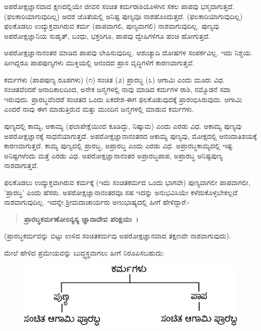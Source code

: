 
ಅಪರೋಕ್ಷಜ್ಞಾನವಾದ ಕ್ಷಣದಲ್ಲಿಯೇ ಜೀವನ ಸಂಚಿತ ಕರ್ಮರಾಶಿಯೊಳಗಿನ ಸಕಲ ಪಾಪವು ಭಸ್ಮವಾಗುತ್ತದೆ. (ಫಲಕಾರಿಯಾಗುವುದಿಲ್ಲ) ಅದರ ಜೊತೆಯಲ್ಲಿ ಅನಿಷ್ಟ ಪುಣ್ಯವೂ ನಾಶಹೊಂದುತ್ತದೆ. (ಫಲಕಾರಿಯಾಗುವುದಿಲ್ಲ) ಫಲಕೊಡಲು ಉದ್ಯುಕ್ತವಾಗಿರುವ ಕರ್ಮ (ಪಾಪವಾಗಲಿ, ಪುಣ್ಯವಾಗಲಿ) ನಾಶವಾಗುವುದಿಲ್ಲ. ಪುಣ್ಯವು ಅಪರೋಕ್ಷಜ್ಞಾನಿಯ ಸುಹೃತ್, ಬಂಧು, ಭಕ್ತರಿಗೂ, ಪಾಪವು ದ್ವೇಷಿಗಳಿಗೂ ಹಂಚಿ ಹೋಗುತ್ತದೆ.

ಅಪರೋಕ್ಷಜ್ಞಾನಾನಂತರ ಮಾಡಿದ ಪಾಪವು ಲೇಪಿಸುವುದಿಲ್ಲ. ಆಶುಚ್ಯಾದಿ ದೋಷಗಳ ಸಂಪರ್ಕವಿಲ್ಲ. ಇದು ನಿಶ್ಚಯ. ಹೀಗಿದ್ದರೂ ಪಾಪಪುಣ್ಯಗಳು ಮುಕ್ತಿಯಲ್ಲಿ ಆನಂದದ ಹ್ರಾಸ ವೃದ್ಧಿಗಳಿಗೆ ಕಾರಣವಾಗುತ್ತವೆ.

ಕರ್ಮಗಳು (ಪಾಪಪುಣ್ಯ ರೂಪಗಳು) (೧) ಸಂಚಿತ (೨) ಪ್ರಾರಬ್ಧ (೩) ಆಗಾಮಿ ಎಂದು ಮೂರು ವಿಧ. ಸಂಚಿತವೆಂದರೆ ಅನಾದಿಕಾಲದಿಂದ, ಅನೇಕ ಜನ್ಮಗಳಲ್ಲಿ ನಾವು ಮಾಡಿದ ಕರ್ಮಗಳ ರಾಶಿ, ನಮ್ಮೊಡನೆ ಸದಾ ಇರುವುದು. ಪ್ರಾರಬ್ಧವೆಂದರೆ ಸಂಚಿತದ ಒಂದು ಏಕದೇಶ-ಈಗ ಫಲಕೊಡುವುದಕ್ಕೆ ಪ್ರಾರಂಭಿಸಿರುವುದು. ಆಗಾಮಿ ಎಂದರೆ ನಾವು ಈಗ ಮಾಡುತ್ತಿರುವ ಮತ್ತು ಮುಂದಿನ ಜನ್ಮಗಳಲ್ಲಿ ಮಾಡುವ ಕರ್ಮಗಳು.

ಪುಣ್ಯದಲ್ಲಿ ಕಾಮ್ಯ, ಅಕಾಮ್ಯ (ಫಲಾಪೇಕ್ಷೆಯಿಂದ ಕೂಡಿದ್ದು, ನಿಷ್ಕಾಮ) ಎಂದು ಎರಡು ವಿಧ. ಅಕಾಮ್ಯ ಪುಣ್ಯವು ಅಪರೋಕ್ಷಜ್ಞಾನಕ್ಕೆ ಸಾಧನೆಯಾಗುತ್ತದೆ. ಅಪರೋಕ್ಷಜ್ಞಾನಾನಂತರದ ಅಕಾಮ್ಯ ಪುಣ್ಯವು, ಮೋಕ್ಷದಲ್ಲಿ ಆನಂದಾತಿಶಯಕ್ಕೆ ಕಾರಣವಾಗುತ್ತದೆ. ಕಾಮ್ಯ ಪುಣ್ಯದಲ್ಲಿ ಪ್ರಾರಬ್ಧ, ಅಪ್ರಾರಬ್ಧ ಎಂದು ಎರಡು ವಿಧ. ಅಪ್ರಾರಬ್ಧಕಾಮ್ಯದಲ್ಲಿ ಇಷ್ಟ ಅನಿಷ್ಟಗಳೆಂದು ಮತ್ತೆ ಎರಡು ವಿಧ. ಅಪರೋಕ್ಷಜ್ಞಾನಾನಂತರ ಅಪ್ರಾರಬ್ಧಪಾಪ, ಅಪ್ರಾರಬ್ಧ ಅನಿಷ್ಟಪುಣ್ಯ ನಾಶವಾಗುತ್ತವೆ.

ಫಲಕೊಡಲು ಉದ್ಯುಕ್ತವಾಗಿರುವ ಕರ್ಮಕ್ಕೆ (ಇದು ಸಂಚಿತಕರ್ಮದ ಒಂದು ಭಾಗವೇ) ಪುಣ್ಯವಾಗಲೀ ಪಾಪವಾಗಲೀ, 'ಪ್ರಾರಬ್ಧ' ಎಂದು ಹೆಸರು. ಅಪರೋಕ್ಷಜ್ಞಾನಾನಂತರವೂ ಸಹ ಇದನ್ನು ಅನುಭವಿಸಿಯೇ ಕಳೆದುಕೊಳ್ಳಬೇಕಲ್ಲದೆ ನಾಶವಾಗುವುದಿಲ್ಲ. ಇದನ್ನೇ ಶ‍್ರೀಮದಾಚಾರ್ಯರು ಅಣುಭಾಷ್ಯದಲ್ಲಿ ಹೀಗೆ ಹೇಳಿದ್ದಾರೆ:-

\begin{verse}
\textbf{ಪ್ರಾರಬ್ಧಕರ್ಮಣೋಽನ್ಯಸ್ಯ ಜ್ಞಾನಾದೇವ ಪರಿಕ್ಷಯಃ~।}
\end{verse}

(ಪ್ರಾರಬ್ಧಕರ್ಮವನ್ನು ಬಿಟ್ಟು ಉಳಿದ ಸಂಚಿತಕರ್ಮವು ಅಪರೋಕ್ಷಜ್ಞಾನವಾದ ತಕ್ಷಣವೇ ನಾಶವಾಗುವುದು).

ಮೇಲೆ ಹೇಳಿದ ಪ್ರಮೇಯವನ್ನು ಬುದ್ಧ್ಯಸ್ಥವಾಗಲು ಹೀಗೆ ನಿರೂಪಿಸಬಹುದು:

\begin{figure}[!htbp]
\includegraphics[scale=.77]{images/fig3.jpg}
\end{figure}

